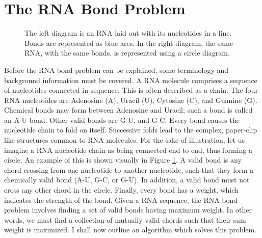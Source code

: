 \documentclass[12pt, a4paper]{article}
\begin{document}
\section{The RNA Bond Problem}

\begin{figure}
\begin{center}
\end{center}
\caption{The left diagram is an RNA laid out with its nucleotides in a line. Bonds are represented as blue arcs. In the right diagram, the same RNA, with the same bonds, is represented using a circle diagram.}
\label{fig:line2circle}
\end{figure}

Before the RNA bond problem can be explained, some terminology and background information must be covered. A RNA molecule comprises a sequence of nucleotides connected in sequence. This is often described as a chain. The four RNA nucleotides are Adenosine (A), Uracil (U), Cytosine (C), and Guanine (G). Chemical bonds may form between Adenosine and Uracil; such a bond is called an A-U bond. Other valid bonds are G-U, and G-C. Every bond causes the nucleotide chain to fold on itself. Successive folds lead to the complex, paper-clip like structures common to RNA molecules. For the sake of illustration, let us imagine a RNA nucleotide chain as being connected end to end, thus forming a circle. An example of this is shown visually in Figure \ref{fig:line2circle}. A valid bond is any chord crossing from one nucleotide to  another nucleotide, such that they form a chemically valid bond (A-U, G-C, or G-U). In addition, a valid bond must not cross any other chord in the circle. Finally, every bond has a weight, which indicates the strength of the bond. Given a RNA sequence, the RNA bond problem involves finding a set of valid bonds having maximum weight. In other words, we must find a collection of mutually valid chords such that their sum weight is maximized. I shall now outline an algorithm which solves this problem.
\end{document}
